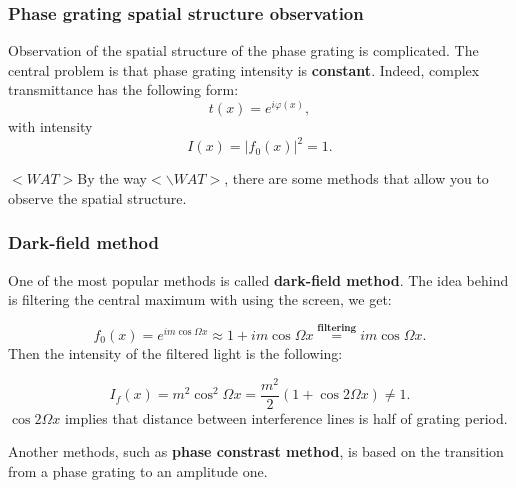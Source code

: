 \documentclass{beamer}
\begin{document}
	\begin{frame}
		\frametitle{Phase grating spatial structure observation}
		
				Observation of the spatial structure of the phase grating is complicated. The central problem is that phase grating intensity is \textbf{constant}. Indeed, complex transmittance has the following form:
				$$t(x) = e^{i\varphi(x)},$$ with intensity
				$$I(x) = |f_0(x)|^2 = 1.$$
				
				$<WAT>$By the way$<\backslash WAT>$, there are some methods that allow you to observe the spatial structure.

	\end{frame}

	\begin{frame}
		\frametitle{Dark-field method}
		
		One of the most popular methods is called \textbf{dark-field method}. The idea behind is filtering the central maximum with using the screen, we get:
		
		\begin{equation*}
				f_0(x) = e^{i m \cos{\Omega x}} \approx 1 +  i m \cos{\Omega x} \overset{\textbf{filtering}}{=}  i m \cos{\Omega x}.
		\end{equation*}
		Then the intensity of the filtered light is the following:
		
		\begin{equation*}
				I_f(x) = m^2 \cos^2{\Omega x} = \frac{m^2}{2} (1 + \cos{2 \Omega x}) \neq 1.
				\label{eq:dark_field}
		\end{equation*}
		$\cos{2 \Omega x}$ implies that distance between interference lines is half of grating period.
	
		Another methods, such as \textbf{phase constrast method}, is based on the transition from a phase grating to an amplitude one.
	\end{frame}
\end{document}
